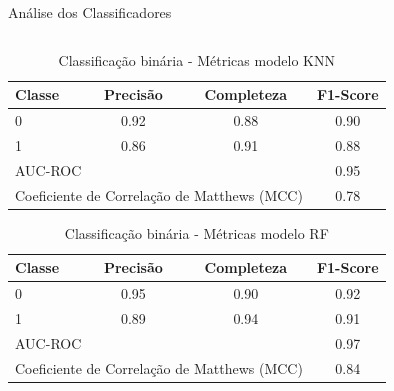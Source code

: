 \begin{frame}[c]{Análise dos Classificadores}
    \begin{columns}[c]
        \begin{column}{0.48\textwidth}
            \vspace{-0.8cm} %
            \scriptsize
            \begin{table}[!ht]
                \centering
                \caption{Classificação binária - Métricas modelo KNN}
                \begin{tabular}{lccc}
                    \toprule
                    Classe & Precisão & Completeza & F1-Score \\
                    \midrule
                    0 & 0.92 & 0.88 & 0.90 \\
                    1 & 0.86 & 0.91 & 0.88 \\
                    \midrule
                    \multicolumn{3}{l}{AUC-ROC} & 0.95 \\
                    \multicolumn{3}{l}{Coeficiente de Correlação de Matthews (MCC)} & 0.78 \\
                    \bottomrule
                \end{tabular}
            \end{table}
            \begin{table}[!ht]
                \centering
                \caption{Classificação binária - Métricas modelo RF}
                \begin{tabular}{lccc}
                    \toprule
                    Classe & Precisão & Completeza & F1-Score \\
                    \midrule
                    0 & 0.95 & 0.90 & 0.92 \\
                    1 & 0.89 & 0.94 & 0.91 \\
                    \midrule
                    \multicolumn{3}{l}{AUC-ROC} & 0.97 \\
                    \multicolumn{3}{l}{Coeficiente de Correlação de Matthews (MCC)} & 0.84 \\
                    \bottomrule
                \end{tabular}
            \end{table}
        \end{column}
        \begin{column}{0.48\textwidth}

\end{column}
\end{columns}
\end{frame}
